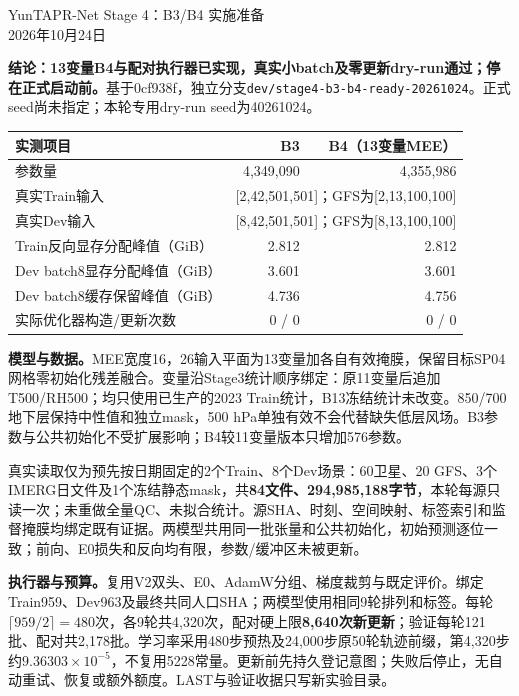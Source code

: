 \documentclass[UTF8,10pt]{ctexart}
\begin{document}
\begin{center}{\Large YunTAPR-Net Stage 4：B3/B4 实施准备}\\[3pt]2026年10月24日\end{center}
\textbf{结论：13变量B4与配对执行器已实现，真实小batch及零更新dry-run通过；停在正式启动前。}基于0cf938f，独立分支\texttt{dev/stage4-b3-b4-ready-20261024}。正式seed尚未指定；本轮专用dry-run seed为40261024。

\begin{tabularx}{\textwidth}{Xrr}
\toprule 实测项目 & B3 & B4（13变量MEE）\\\midrule
参数量 & 4,349,090 & 4,355,986\\
真实Train输入 & \multicolumn{2}{c}{[2,42,501,501]；GFS为[2,13,100,100]}\\
真实Dev输入 & \multicolumn{2}{c}{[8,42,501,501]；GFS为[8,13,100,100]}\\
Train反向显存分配峰值（GiB） & 2.812 & 2.812\\
Dev batch8显存分配峰值（GiB） & 3.601 & 3.601\\
Dev batch8缓存保留峰值（GiB） & 4.736 & 4.756\\
实际优化器构造/更新次数 & 0 / 0 & 0 / 0\\\bottomrule
\end{tabularx}

\textbf{模型与数据。}MEE宽度16，26输入平面为13变量加各自有效掩膜，保留目标SP04网格零初始化残差融合。变量沿Stage3统计顺序绑定：原11变量后追加T500/RH500；均只使用已生产的2023 Train统计，B13冻结统计未改变。850/700地下层保持中性值和独立mask，500 hPa单独有效不会代替缺失低层风场。B3参数与公共初始化不受扩展影响；B4较11变量版本只增加576参数。

真实读取仅为预先按日期固定的2个Train、8个Dev场景：60卫星、20 GFS、3个IMERG日文件及1个冻结静态mask，共\textbf{84文件、294,985,188字节}，本轮每源只读一次；未重做全量QC、未拟合统计。源SHA、时刻、空间映射、标签索引和监督掩膜均绑定既有证据。两模型共用同一批张量和公共初始化，初始预测逐位一致；前向、E0损失和反向均有限，参数/缓冲区未被更新。

\textbf{执行器与预算。}复用V2双头、E0、AdamW分组、梯度裁剪与既定评价。绑定Train959、Dev963及最终共同人口SHA；两模型使用相同9轮排列和标签。每轮$\lceil959/2\rceil=480$次，各9轮共4,320次，配对硬上限\textbf{8,640次新更新}；验证每轮121批、配对共2,178批。学习率采用480步预热及24,000步原50轮轨迹前缀，第4,320步约$9.36303\times10^{-5}$，不复用5228常量。更新前先持久登记意图；失败后停止，无自动重试、恢复或额外额度。LAST与验证收据只写新实验目录。
\end{document}
